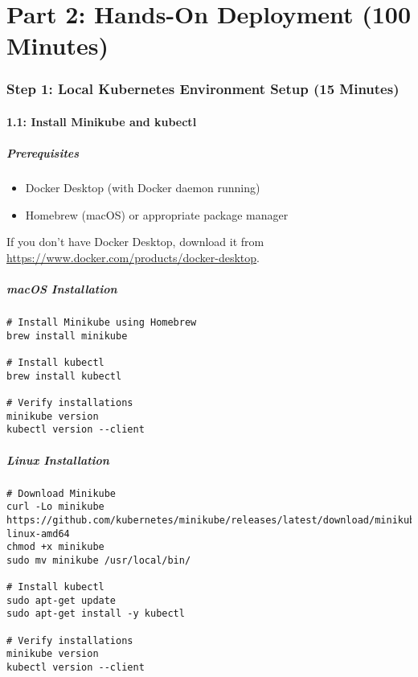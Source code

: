 \documentclass[12pt,a4paper]{article}
\begin{document}
\newpage

\part{Part 2: Hands-On Deployment (100 Minutes)}

\section{Step 1: Local Kubernetes Environment Setup (15 Minutes)}

\subsection{1.1: Install Minikube and kubectl}

\subsubsection{Prerequisites}

\begin{itemize}
    \item Docker Desktop (with Docker daemon running)
    \item Homebrew (macOS) or appropriate package manager
\end{itemize}

\begin{importantbox}
If you don't have Docker Desktop, download it from \url{https://www.docker.com/products/docker-desktop}.
\end{importantbox}

\subsubsection{macOS Installation}

\begin{lstlisting}[caption=Install Minikube and kubectl on macOS]
# Install Minikube using Homebrew
brew install minikube

# Install kubectl
brew install kubectl

# Verify installations
minikube version
kubectl version --client
\end{lstlisting}

\subsubsection{Linux Installation}

\begin{lstlisting}[caption=Install Minikube and kubectl on Linux]
# Download Minikube
curl -Lo minikube https://github.com/kubernetes/minikube/releases/latest/download/minikube-linux-amd64
chmod +x minikube
sudo mv minikube /usr/local/bin/

# Install kubectl
sudo apt-get update
sudo apt-get install -y kubectl

# Verify installations
minikube version
kubectl version --client
\end{lstlisting}
\end{document}
